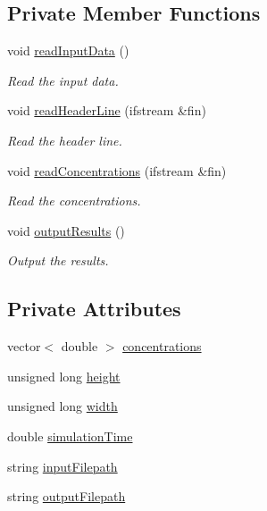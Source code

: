 \subsection*{\-Private \-Member \-Functions}
\begin{DoxyCompactItemize}
\item 
void \hyperlink{classmultiscale_1_1video_1_1CartesianToConcentrationsConverter_a94094cdeaf0f48164911188709dc0e2f}{read\-Input\-Data} ()
\begin{DoxyCompactList}\small\item\em \-Read the input data. \end{DoxyCompactList}\item 
void \hyperlink{classmultiscale_1_1video_1_1CartesianToConcentrationsConverter_a2e9967ae6fb2efc39ed377aca2fa222c}{read\-Header\-Line} (ifstream \&fin)
\begin{DoxyCompactList}\small\item\em \-Read the header line. \end{DoxyCompactList}\item 
void \hyperlink{classmultiscale_1_1video_1_1CartesianToConcentrationsConverter_a9134409b814fafe62c896c6b473bc574}{read\-Concentrations} (ifstream \&fin)
\begin{DoxyCompactList}\small\item\em \-Read the concentrations. \end{DoxyCompactList}\item 
void \hyperlink{classmultiscale_1_1video_1_1CartesianToConcentrationsConverter_a346e054266585ae6922d159b8d5fb804}{output\-Results} ()
\begin{DoxyCompactList}\small\item\em \-Output the results. \end{DoxyCompactList}\end{DoxyCompactItemize}
\subsection*{\-Private \-Attributes}
\begin{DoxyCompactItemize}
\item 
vector$<$ double $>$ \hyperlink{classmultiscale_1_1video_1_1CartesianToConcentrationsConverter_a335f54163cbabeaa80c1da811b9f9c0c}{concentrations}
\item 
unsigned long \hyperlink{classmultiscale_1_1video_1_1CartesianToConcentrationsConverter_a94e58072f2e143bd6476133370ffb37f}{height}
\item 
unsigned long \hyperlink{classmultiscale_1_1video_1_1CartesianToConcentrationsConverter_ae6fba5af405d884c7b70ed206a6d5cb1}{width}
\item 
double \hyperlink{classmultiscale_1_1video_1_1CartesianToConcentrationsConverter_a6e66af60b82513b3186fdb32cad44597}{simulation\-Time}
\item 
string \hyperlink{classmultiscale_1_1video_1_1CartesianToConcentrationsConverter_affebbc7e1c67692bd529f19fc0451e58}{input\-Filepath}
\item 
string \hyperlink{classmultiscale_1_1video_1_1CartesianToConcentrationsConverter_a9215448e33876a581b206a89b6651fd0}{output\-Filepath}
\end{DoxyCompactItemize}
